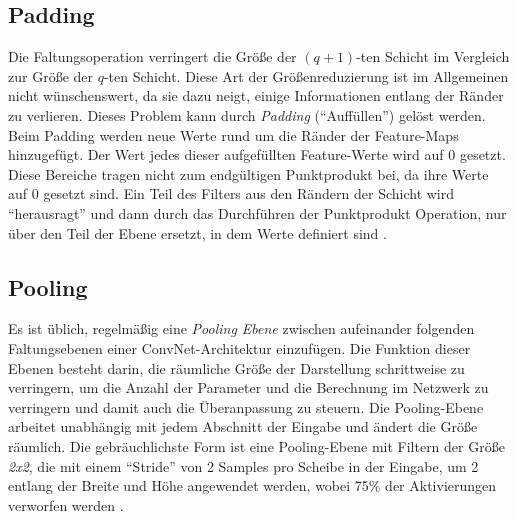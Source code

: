\subsection{Padding}
Die Faltungsoperation verringert die Größe der $(q + 1)$-ten Schicht im Vergleich zur Größe der $q$-ten Schicht. Diese Art der Größenreduzierung ist im Allgemeinen nicht wünschenswert, da sie dazu neigt, einige Informationen entlang der Ränder zu verlieren. Dieses Problem kann durch \textit{Padding} (\enquote{Auffüllen}) gelöst werden. Beim Padding werden neue Werte rund um die Ränder der Feature-Maps hinzugefügt. Der Wert jedes dieser aufgefüllten Feature-Werte wird auf 0 gesetzt. Diese Bereiche tragen nicht zum endgültigen Punktprodukt bei, da ihre Werte auf 0 gesetzt sind. Ein Teil des Filters aus den Rändern der Schicht wird \enquote{herausragt} und dann durch das Durchführen der Punktprodukt Operation, nur über den Teil der Ebene ersetzt, in dem Werte definiert sind \cite*[323]{Aggarwal2018}.


\subsection{Pooling}
Es ist üblich, regelmäßig eine \textit{Pooling Ebene} zwischen aufeinander folgenden Faltungsebenen einer ConvNet-Architektur einzufügen. Die Funktion dieser Ebenen besteht darin, die räumliche Größe der Darstellung schrittweise zu verringern, um die Anzahl der Parameter und die Berechnung im Netzwerk zu verringern und damit auch die Überanpassung zu steuern. Die Pooling-Ebene arbeitet unabhängig mit jedem Abschnitt der Eingabe und ändert die Größe räumlich. Die gebräuchlichste Form ist eine Pooling-Ebene mit Filtern der Größe \textit{2x2}, die mit einem  \enquote{Stride} von 2 Samples pro Scheibe in der Eingabe, um 2 entlang der Breite und Höhe angewendet werden, wobei 75\% der Aktivierungen verworfen werden \cite*{StanfordUniversityCoursecs231n2018a}.

